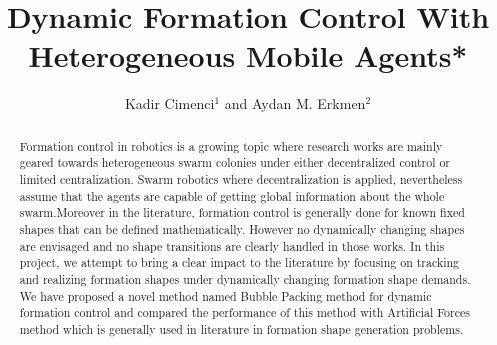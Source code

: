 \documentclass[letterpaper, 10 pt, conference]{ieeeconf}  %
\title{\LARGE \bf
Dynamic Formation Control With Heterogeneous Mobile Agents*
}
\author{Kadir Cimenci$^{1}$ and Aydan M. Erkmen$^{2}$%
}
\begin{document}
\maketitle
\thispagestyle{empty}
\pagestyle{empty}


\begin{abstract}
Formation control in robotics is a growing topic where research works are mainly geared towards heterogeneous swarm colonies under either decentralized control or limited centralization. Swarm robotics where decentralization is applied, nevertheless assume that the agents are capable of getting global information about the whole swarm.Moreover in the literature, formation control is generally done for known fixed shapes that can be defined mathematically. However no dynamically changing shapes are envisaged and no shape transitions are clearly handled in those works. In this project, we attempt to bring a clear impact to the literature by focusing on tracking and realizing formation shapes under dynamically changing formation shape demands. We have proposed a novel method named Bubble Packing method for dynamic formation control and compared the performance of this method with Artificial Forces method which is generally used in literature in formation shape generation problems.
\end{abstract}
\end{document}
